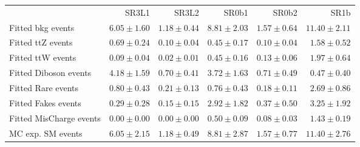 \begin{tabular*}{\textwidth}{@{\extracolsep{\fill}}lrrrrr}

\noalign{\smallskip}\hline\noalign{\smallskip}

           & SR3L1    & SR3L2   & SR0b1   & SR0b2   & SR1b  \\[-0.05cm]

\noalign{\smallskip}\hline\noalign{\smallskip}


Fitted bkg events         & $6.05 \pm 1.60$    & $1.18 \pm 0.44$   & $8.81 \pm 2.03$   & $1.57 \pm 0.64$   & $11.40 \pm 2.11$  \\

\noalign{\smallskip}\hline\noalign{\smallskip}


        Fitted ttZ events         & $0.69 \pm 0.24$    & $0.10 \pm 0.04$   & $0.45 \pm 0.17$   & $0.10 \pm 0.04$   & $1.58 \pm 0.52$  \\


        Fitted ttW events         & $0.09 \pm 0.04$    & $0.02 \pm 0.01$   & $0.45 \pm 0.16$   & $0.13 \pm 0.06$   & $1.97 \pm 0.64$  \\


        Fitted Diboson events         & $4.18 \pm 1.59$    & $0.70 \pm 0.41$   & $3.72 \pm 1.63$   & $0.71 \pm 0.49$   & $0.47 \pm 0.40$  \\


        Fitted Rare events         & $0.80 \pm 0.43$    & $0.21 \pm 0.13$   & $0.76 \pm 0.43$   & $0.18 \pm 0.11$   & $2.69 \pm 0.86$  \\


        Fitted Fakes events         & $0.29 \pm 0.28$    & $0.15 \pm 0.15$   & $2.92 \pm 1.82$   & $0.37 \pm 0.50$   & $3.25 \pm 1.92$  \\


        Fitted MisCharge events         & $0.00 \pm 0.00$    & $0.00 \pm 0.00$   & $0.50 \pm 0.09$   & $0.08 \pm 0.03$   & $1.43 \pm 0.19$  \\


 \noalign{\smallskip}\hline\noalign{\smallskip}


MC exp. SM events              & $6.05 \pm 2.15$    & $1.18 \pm 0.49$   & $8.81 \pm 2.87$   & $1.57 \pm 0.77$   & $11.40 \pm 2.76$  \\


\end{tabular*}
